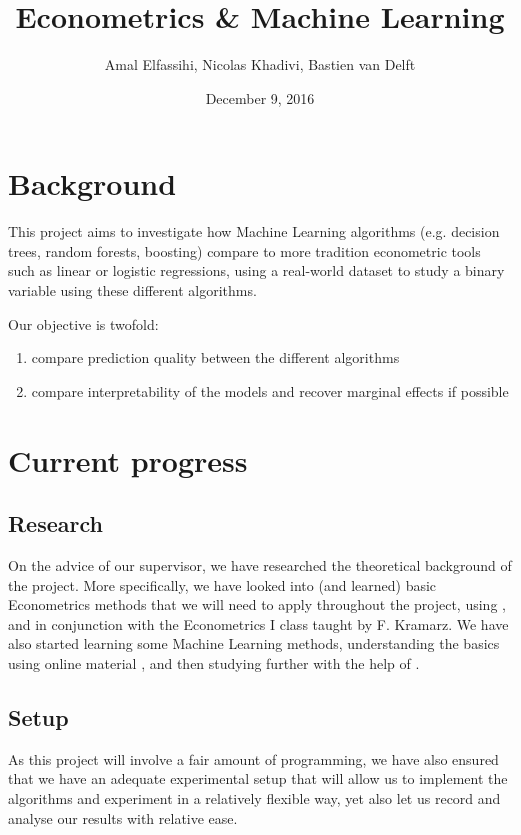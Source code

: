 \documentclass[a4paper]{article}
\begin{document}
\title{Econometrics \& Machine Learning}
\author{Amal Elfassihi, Nicolas Khadivi, Bastien van Delft}
\date{December 9, 2016}
\maketitle

\section{Background}

This project aims to investigate how Machine Learning algorithms (e.g. decision trees, random
forests, boosting) compare to more tradition econometric tools such as linear or logistic
regressions, using a real-world dataset \cite{enquete} to study a binary variable using these
different algorithms.

Our objective is twofold:
\begin{enumerate}[nosep]
    \item compare prediction quality between the different algorithms
    \item compare interpretability of the models and recover marginal effects if possible
\end{enumerate}

\section{Current progress}
\subsection{Research}
On the advice of our supervisor, we have researched the theoretical background of the project. More specifically, we have looked into (and learned) basic Econometrics methods that we will need to apply throughout the project, using \cite{wooldridge}, and in conjunction with the Econometrics I class taught by F. Kramarz. We have also started learning some Machine Learning methods, understanding the basics using online material \cite{vidhya}, and then studying further with the help of \cite{introR}.

\subsection{Setup}
As this project will involve a fair amount of programming, we have also ensured that we have an adequate experimental setup that will allow us to implement the algorithms and experiment in a relatively flexible way, yet also let us record and analyse our results with relative ease.
\end{document}
